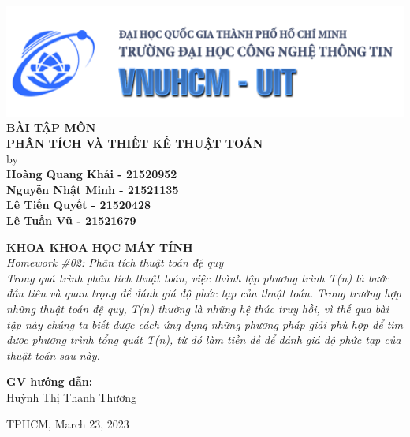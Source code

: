 \documentclass[12pt, a4paper]{article}
\begin{document}

\begin{titlepage}

\begin{center}

\includegraphics[width=1\textwidth]{img/banner_uit.png}\\%
\vspace{3em}%
\Large \textbf {BÀI TẬP MÔN\\PHÂN TÍCH VÀ THIẾT KẾ THUẬT TOÁN}\\%
\vspace{1em}%
\normalsize by \\%
\vspace{1em}
\textup{\small\bf {Hoàng Quang Khải - 21520952}\\
{Nguyễn Nhật Minh - 21521135}\\
{Lê Tiến Quyết - 21520428}\\
{Lê Tuấn Vũ - 21521679}
}


 \vspace{1em}%
{\bf KHOA KHOA HỌC MÁY TÍNH}\\[0.5in]

\emph{Homework \#02: Phân tích thuật toán đệ quy\\ Trong quá trình phân tích thuật toán, việc thành lập phương trình T(n) là bước đầu tiên và quan trọng để đánh giá độ phức tạp của thuật toán. Trong trường hợp những thuật toán đệ quy, T(n) thường là những hệ thức truy hồi, vì thế qua bài tập này chúng ta biết được cách ứng dụng những phương pháp giải phù hợp để tìm được phương trình tổng quát T(n), từ đó làm tiền đề để đánh giá độ phức tạp của thuật toán sau này.}

\vspace{1in}

    
\normalsize {\bf GV hướng dẫn:} \\

Huỳnh Thị Thanh Thương\\
\vspace{1em}

\vfill


TPHCM, March 23, 2023

\end{center}

\end{titlepage}
\end{document}
